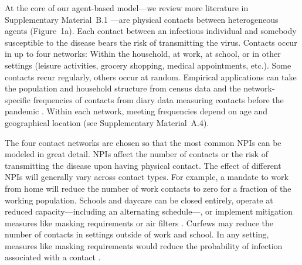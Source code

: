 \documentclass[fleqn,10pt]{wlscirep}
\begin{document}
At the core of our agent-based model---we review more literature in Supplementary
Material~B.1 \cite{Aleta2020,Hinch2021a}---are physical contacts between heterogeneous
agents (Figure~1a). Each contact between an infectious individual and somebody
susceptible to the disease bears the risk of transmitting the virus. Contacts occur in
up to four networks: Within the household, at work, at school, or in other settings
(leisure activities, grocery shopping, medical appointments, etc.). Some contacts recur
regularly, others occur at random. Empirical applications can take the population and
household structure from census data and the network-specific frequencies of contacts
from diary data measuring contacts before the pandemic \cite{Mossong2008,Hoang2019}.
Within each network, meeting frequencies depend on age and geographical location (see
Supplementary Material~A.4).

The four contact networks are chosen so that the most common NPIs can be modeled in
great detail. NPIs affect the number of contacts or the risk of transmitting the disease
upon having physical contact. The effect of different NPIs will generally vary across
contact types. For example, a mandate to work from home will reduce the number of work
contacts to zero for a fraction of the working population. Schools and daycare can be
closed entirely, operate at reduced capacity---including an alternating schedule---, or
implement mitigation measures like masking requirements or air filters
\cite{Lessler2021}. Curfews may reduce the number of contacts in settings outside of
work and school. In any setting, measures like masking requirements would reduce the
probability of infection associated with a contact \cite{Cheng2021}.
\end{document}

